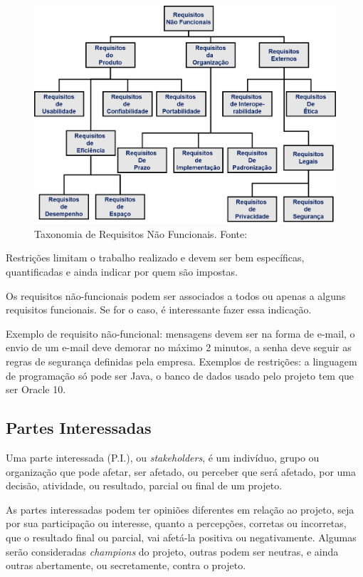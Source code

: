 \documentclass[a4]{report}
\newcommand{\othersize}{0.7\linewidth}
\begin{document}
\begin{figure}
    \centering
    \includegraphics[width=\othersize]{imagens/NonFunReq.png}
    \caption{Taxonomia de Requisitos Não Funcionais. Fonte: \citet{sommerville:software:2015}}
    \label{fig:nofunreq}
\end{figure}

Restrições limitam o trabalho realizado e devem ser bem específicas, quantificadas e ainda indicar por quem são impostas.

Os requisitos não-funcionais podem ser associados a todos ou apenas a alguns requisitos funcionais. Se for o caso, é interessante fazer essa indicação.

Exemplo de requisito não-funcional: mensagens devem ser na forma de e-mail, o envio de um e-mail deve demorar no máximo 2 minutos, a senha deve seguir as regras de segurança definidas pela empresa. Exemplos de restrições: a linguagem de programação só pode ser Java, o banco de dados usado pelo projeto tem que ser Oracle 10.

\subsection{Partes Interessadas}

Uma parte interessada (P.I.), ou \textit{stakeholders}, é um indivíduo, grupo ou organização que pode afetar, ser afetado, ou perceber que será afetado, por uma decisão, atividade, ou resultado, parcial ou final de um projeto\citep{pmbok:6}.

As partes interessadas  podem ter opiniões diferentes em relação ao projeto, seja por sua participação ou interesse, quanto a percepções, corretas ou incorretas, que o resultado final ou parcial, vai afetá-la positiva ou negativamente.  Algumas serão consideradas \textit{champions} do projeto, outras podem ser neutras, e ainda outras abertamente, ou secretamente, contra o projeto.
\end{document}
